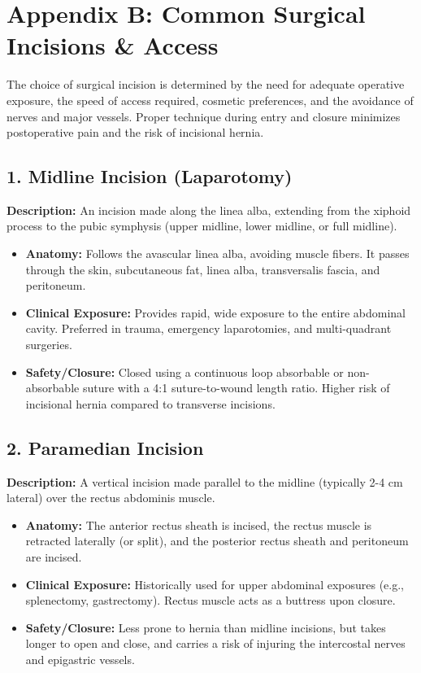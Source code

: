 \chapter*{Appendix B: Common Surgical Incisions \& Access}

The choice of surgical incision is determined by the need for adequate operative exposure, the speed of access required, cosmetic preferences, and the avoidance of nerves and major vessels. Proper technique during entry and closure minimizes postoperative pain and the risk of incisional hernia.

\section*{1. Midline Incision (Laparotomy)}
\textbf{Description:} An incision made along the linea alba, extending from the xiphoid process to the pubic symphysis (upper midline, lower midline, or full midline).
\begin{itemize}
  \item \textbf{Anatomy:} Follows the avascular linea alba, avoiding muscle fibers. It passes through the skin, subcutaneous fat, linea alba, transversalis fascia, and peritoneum.
  \item \textbf{Clinical Exposure:} Provides rapid, wide exposure to the entire abdominal cavity. Preferred in trauma, emergency laparotomies, and multi-quadrant surgeries.
  \item \textbf{Safety/Closure:} Closed using a continuous loop absorbable or non-absorbable suture with a 4:1 suture-to-wound length ratio. Higher risk of incisional hernia compared to transverse incisions.
\end{itemize}

\section*{2. Paramedian Incision}
\textbf{Description:} A vertical incision made parallel to the midline (typically 2-4 cm lateral) over the rectus abdominis muscle.
\begin{itemize}
  \item \textbf{Anatomy:} The anterior rectus sheath is incised, the rectus muscle is retracted laterally (or split), and the posterior rectus sheath and peritoneum are incised.
  \item \textbf{Clinical Exposure:} Historically used for upper abdominal exposures (e.g., splenectomy, gastrectomy). Rectus muscle acts as a buttress upon closure.
  \item \textbf{Safety/Closure:} Less prone to hernia than midline incisions, but takes longer to open and close, and carries a risk of injuring the intercostal nerves and epigastric vessels.
\end{itemize}

